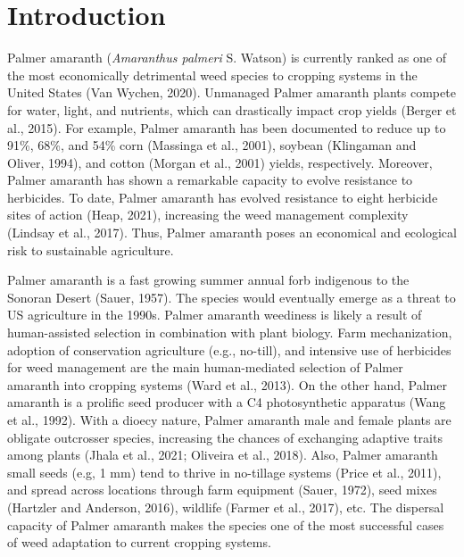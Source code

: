 \documentclass[utf8]{frontiersSCNS}
\begin{document}
\hypertarget{introduction}{%
\section*{Introduction}\label{introduction}}

Palmer amaranth (\emph{Amaranthus palmeri} S. Watson) is currently
ranked as one of the most economically detrimental weed species to
cropping systems in the United States (Van Wychen, 2020). Unmanaged
Palmer amaranth plants compete for water, light, and nutrients, which
can drastically impact crop yields (Berger et al., 2015). For example,
Palmer amaranth has been documented to reduce up to 91\%, 68\%, and 54\%
corn (Massinga et al., 2001), soybean (Klingaman and Oliver, 1994), and
cotton (Morgan et al., 2001) yields, respectively. Moreover, Palmer
amaranth has shown a remarkable capacity to evolve resistance to
herbicides. To date, Palmer amaranth has evolved resistance to eight
herbicide sites of action (Heap, 2021), increasing the weed management
complexity (Lindsay et al., 2017). Thus, Palmer amaranth poses an
economical and ecological risk to sustainable agriculture.

Palmer amaranth is a fast growing summer annual forb indigenous to the
Sonoran Desert (Sauer, 1957). The species would eventually emerge as a
threat to US agriculture in the 1990s. Palmer amaranth weediness is
likely a result of human-assisted selection in combination with plant
biology. Farm mechanization, adoption of conservation agriculture (e.g.,
no-till), and intensive use of herbicides for weed management are the
main human-mediated selection of Palmer amaranth into cropping systems
(Ward et al., 2013). On the other hand, Palmer amaranth is a prolific
seed producer with a C4 photosynthetic apparatus (Wang et al., 1992).
With a dioecy nature, Palmer amaranth male and female plants are
obligate outcrosser species, increasing the chances of exchanging
adaptive traits among plants (Jhala et al., 2021; Oliveira et al.,
2018). Also, Palmer amaranth small seeds (e.g, 1 mm) tend to thrive in
no-tillage systems (Price et al., 2011), and spread across locations
through farm equipment (Sauer, 1972), seed mixes (Hartzler and Anderson,
2016), wildlife (Farmer et al., 2017), etc. The dispersal capacity of
Palmer amaranth makes the species one of the most successful cases of
weed adaptation to current cropping systems.
\end{document}
